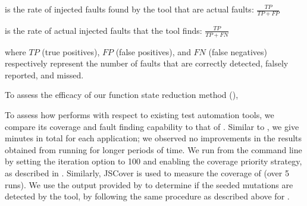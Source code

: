 \begin{description}
\item[Precision] is the rate of injected faults found by the tool that are actual faults: $\frac{\mathit{TP}}{\mathit{TP} + \mathit{FP}}$
\item[Recall] is the rate of actual injected faults that the tool finds: $\frac{\mathit{TP}}{\mathit{TP} + \mathit{FN}}$ 
\end{description}
where $\textit{TP}$ (true positives), $\textit{FP}$ (false positives), and $\textit{FN}$ (false negatives) respectively represent the number of faults that are correctly detected, falsely reported, and missed.

 \label{reduction-setup}
To assess the efficacy of our function state reduction method (),  

 \label{comparison-setup}
To assess how \tool performs with respect to existing \javascript test automation tools, we compare its coverage and fault finding capability to that of \artemis \cite{artzi:icse11}.  
Similar to \tool, we give  minutes in total for each application; we observed no improvements in the results obtained from running \artemis for longer periods of time. 
We run \artemis from the command line by setting the iteration option to 100 and enabling the coverage priority strategy, as described in \cite{artzi:icse11}. %
Similarly, JSCover is used to measure the coverage of \artemis (over 5 runs).
We use the output provided by \artemis to determine if the seeded mutations are detected by the tool, by following the same procedure as described above for \tool. 




%


  
